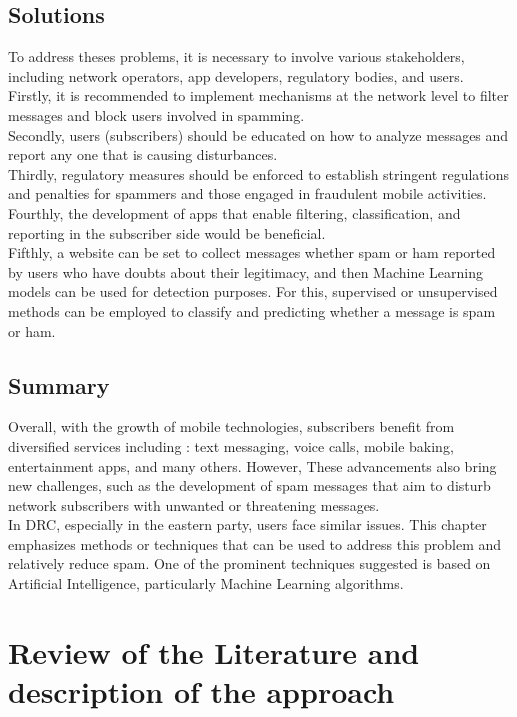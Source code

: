 \documentclass[12pt,a4paper, oneside]{book}
\begin{document}
\section{Solutions}
To address theses problems, it is necessary to involve various stakeholders, including network operators, app developers, regulatory bodies, and users. \\

Firstly, it is recommended to implement mechanisms at the network level \cite{hao2009detecting} to filter messages and block users involved in spamming. \\

Secondly, users (subscribers) should be educated on how to analyze messages and report any one that is causing disturbances. \\

Thirdly, regulatory measures should be enforced to establish stringent regulations and penalties for spammers and those engaged in fraudulent mobile activities. Fourthly, the development of apps that enable filtering, classification, and reporting in the subscriber side would be beneficial.\\

 Fifthly, a website can be set to collect messages whether spam or ham reported by users who have doubts about their legitimacy, and then Machine Learning models can be used for detection purposes. For this, supervised or unsupervised methods can be employed to classify and predicting whether a message is spam or  ham. 
\section{Summary}
Overall, with the growth of mobile technologies, subscribers benefit from diversified services including : text messaging, voice calls, mobile baking, entertainment apps, and many others. However, These advancements also bring new challenges, such as the development of spam messages that aim to disturb network subscribers with unwanted or threatening messages. \\

In DRC, especially in the eastern party, users face similar issues. This chapter emphasizes methods or techniques that can be used to address this problem and relatively reduce spam. One of the prominent techniques suggested is based on Artificial Intelligence, particularly Machine Learning algorithms.
    
    \chapter{Review of the Literature and description of the approach}
\end{document}
